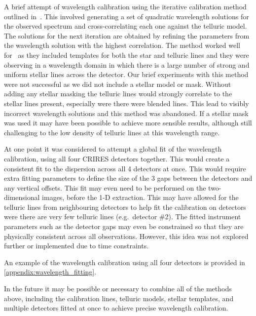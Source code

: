 A brief attempt of wavelength calibration using the iterative calibration method outlined in~\cite{brogi_rotation_2016}.
This involved generating a set of quadratic wavelength solutions for the observed spectrum and cross-correlating each one against the telluric model.
The solutions for the next iteration are obtained by refining the parameters from the wavelength solution with the highest correlation.
The method worked well for~\citet{brogi_rotation_2016} as they included templates for both the star and telluric lines and they were observing in a wavelength domain in which there is a large number of strong and uniform stellar  lines across the detector.
Our brief experiments with this method were not successful as we did not include a stellar model or mask.
Without adding any stellar masking the telluric lines would strongly correlate to the stellar lines present, especially were there were blended lines.
This lead to visibly incorrect wavelength solutions and this method was abandoned.
If a stellar mask was used it may have been possible to achieve more sensible results, although still challenging to the low density of telluric lines at this wavelength range.

At one point it was considered to attempt a global fit of the wavelength calibration, using all four {CRIRES} detectors together.
This would create a consistent fit to the dispersion across all 4 detectors at once.
This would require extra fitting parameters to define the size of the 3 gaps between the detectors and any vertical offsets.
This fit may even need to be performed on the two-dimensional images, before the 1-D extraction.
This may have allowed for the telluric lines from neighbouring detectors to help fit the calibration on detectors were there are very few telluric lines (e.g.\ detector \#2).
The fitted instrument parameters such as the detector gaps may even be constrained so that they are physically consistent across all observations.
However, this idea was not explored further or implemented due to time constraints.


An example of the wavelength calibration using all four detectors is provided in \cref{appendix:wavelength_fitting}.

In the future it may be possible or necessary to combine all of the methods above, including the \thar{} calibration lines, telluric models, stellar templates, and multiple detectors fitted at once to achieve precise wavelength calibration.

